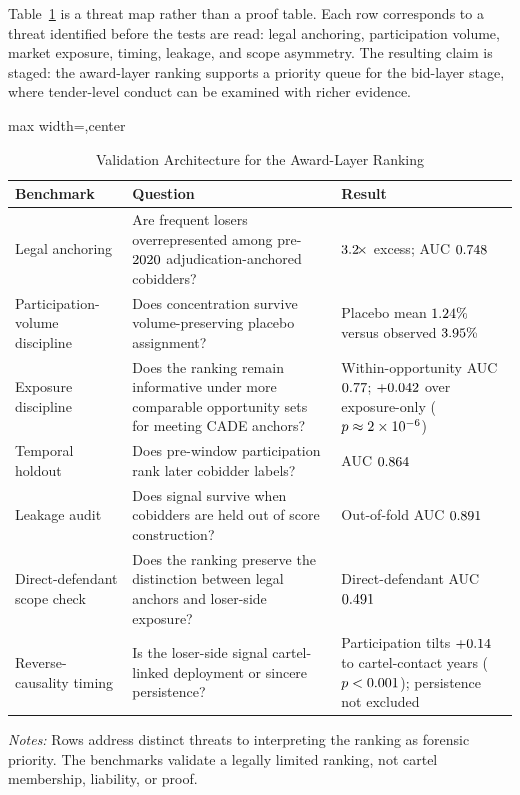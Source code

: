 Table~\ref{tab:validation_benchmarks_submission} is a threat map
rather than a proof table. Each row corresponds to a threat
identified before the tests are read: legal anchoring,
participation volume, market exposure, timing, leakage, and
scope asymmetry. The resulting claim is staged: the award-layer
ranking supports a priority queue for the bid-layer stage, where
tender-level conduct can be examined with richer evidence.

\begin{table}[htbp]
\centering
\caption{Validation Architecture for the Award-Layer Ranking}
\label{tab:validation_benchmarks_submission}
\footnotesize
\begin{adjustbox}{max width=\textwidth,center}
\begin{threeparttable}
\begin{tabular}{p{3.5cm}p{5.3cm}p{4.3cm}}
\toprule
Benchmark & Question & Result \\
\midrule
Legal anchoring & Are frequent losers overrepresented among pre-$2020$ adjudication-anchored cobidders? & $3.2\!\times$ excess; AUC $0.748$ \\
Participation-volume discipline & Does concentration survive volume-preserving placebo assignment? & Placebo mean $1.24\%$ versus observed $3.95\%$ \\
Exposure discipline & Does the ranking remain informative under more comparable opportunity sets for meeting CADE anchors? & Within-opportunity AUC $0.77$; $+0.042$ over exposure-only ($p\approx2\times10^{-6}$) \\
Temporal holdout & Does pre-window participation rank later cobidder labels? & AUC $0.864$ \\
Leakage audit & Does signal survive when cobidders are held out of score construction? & Out-of-fold AUC $0.891$ \\
Direct-defendant scope check & Does the ranking preserve the distinction between legal anchors and loser-side exposure? & Direct-defendant AUC $0.491$ \\
Reverse-causality timing & Is the loser-side signal cartel-linked deployment or sincere persistence? & Participation tilts $+0.14$ to cartel-contact years ($p<0.001$); persistence not excluded \\
\bottomrule
\end{tabular}
\begin{tablenotes}
\footnotesize
\item \textit{Notes:} Rows address distinct threats to
interpreting the ranking as forensic priority. The benchmarks
validate a legally limited ranking, not cartel membership,
liability, or proof.
\end{tablenotes}
\end{threeparttable}
\end{adjustbox}
\end{table}

